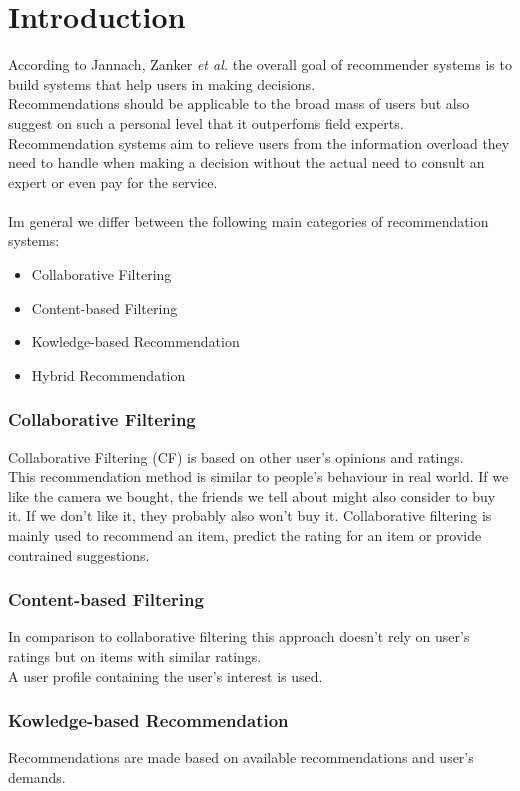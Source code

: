 \documentclass[runningheads,a4paper]{llncs}
\begin{document}
\section{Introduction}
According to Jannach, Zanker \textit{et al.}\cite{jannach2010recommender}
 the overall goal of recommender systems is to build systems that help users in making decisions.\\
Recommendations should be applicable to the broad mass of users but also suggest on such a personal level that it outperfoms field experts. 
\\
Recommendation systems aim to relieve users from the information overload they need to handle when 
making a decision without the actual need to consult an expert or even pay for the service.\\ 
\\
Im general we differ between the following main categories of recommendation systems: 
\begin{itemize}
  \item Collaborative Filtering
  \item Content-based Filtering
  \item Kowledge-based Recommendation
  \item Hybrid Recommendation
\end{itemize}
\subsubsection{Collaborative Filtering}
Collaborative Filtering (CF) is based on other user's opinions and ratings. \\
This recommendation method is similar to people's behaviour in real world. If we like the camera we bought, 
the friends we tell about might also consider to buy it. If we don't like it, they probably also won't buy it.
Collaborative filtering is mainly used to recommend an item, 
predict the rating for an item or provide contrained suggestions. \cite{schafer2007collaborative}
\subsubsection{Content-based Filtering}
In comparison to collaborative filtering this approach doesn't rely on user's ratings but 
on items with similar ratings. \\A user profile containing the user's interest is used. \cite{burke2002hybrid}
\subsubsection{Kowledge-based Recommendation}
Recommendations are made based on available recommendations and user's demands. \cite{burke2002hybrid}
\end{document}

